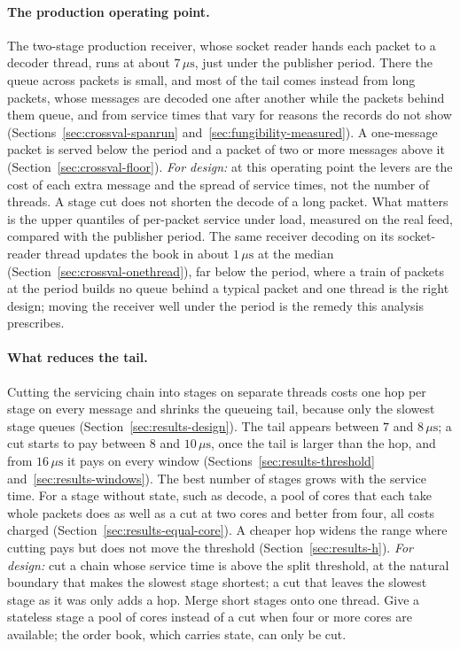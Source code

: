 \documentclass[11pt]{article}
\begin{document}
\paragraph{The production operating point.} The two-stage production receiver, whose
socket reader hands each packet to a decoder thread, runs at about $7\,\mu\mathrm{s}$, just
under the publisher period. There the queue across packets is
small, and most of the tail comes instead from long packets, whose messages are decoded one
after another while the packets behind them queue, and from service times that vary for
reasons the records do not show (Sections~\ref{sec:crossval-spanrun}
and~\ref{sec:fungibility-measured}). A one-message packet is served below the period and a
packet of two or more messages above it (Section~\ref{sec:crossval-floor}).
\emph{For design:} at this operating point the levers are the cost of each extra message
and the spread of service times, not the number of threads. A stage cut does not shorten
the decode of a long packet. What matters is the upper quantiles of per-packet service
under load, measured on the real feed, compared with the publisher period. The same
receiver decoding on its socket-reader thread updates the book in about $1\,\mu\mathrm{s}$
at the median (Section~\ref{sec:crossval-onethread}), far below the period, where a train
of packets at the period builds no queue behind a typical packet and one thread is the
right design; moving the receiver well under the period is the remedy this analysis
prescribes.

\paragraph{What reduces the tail.} Cutting the servicing chain into stages on separate
threads costs one hop per stage on every message and shrinks the queueing tail, because
only the slowest stage queues (Section~\ref{sec:results-design}). The tail appears between
$7$ and $8\,\mu\mathrm{s}$; a cut starts to pay between $8$ and $10\,\mu\mathrm{s}$, once the
tail is larger than the hop, and from $16\,\mu\mathrm{s}$ it pays on every window
(Sections~\ref{sec:results-threshold} and~\ref{sec:results-windows}). The best number of
stages grows with the service time. For a stage without state, such as decode, a pool of
cores that each take whole packets does as well as a cut at two cores and better from four,
all costs charged (Section~\ref{sec:results-equal-core}). A cheaper hop widens the range
where cutting pays but does not move the threshold (Section~\ref{sec:results-h}).
\emph{For design:} cut a chain whose service time is above the split threshold, at the
natural boundary that makes the slowest stage shortest; a cut that leaves the slowest
stage as it was only adds a hop. Merge short stages onto one thread. Give a stateless
stage a pool of cores instead of a cut when four or more cores are available; the order
book, which carries state, can only be cut.
\end{document}
